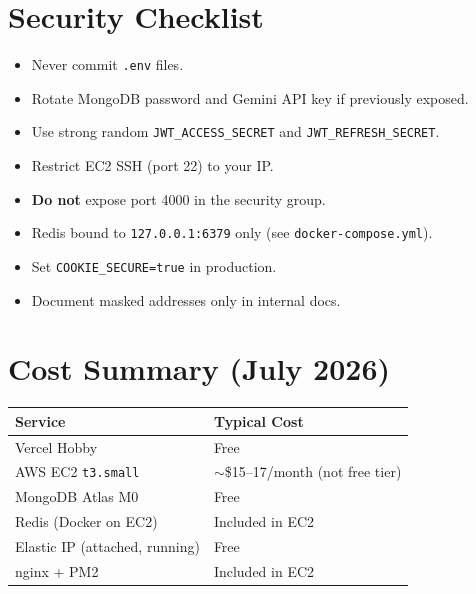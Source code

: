 \documentclass[11pt,a4paper]{article}
\begin{document}
\section{Security Checklist}
\begin{itemize}[noitemsep]
  \item Never commit \texttt{.env} files.
  \item Rotate MongoDB password and Gemini API key if previously exposed.
  \item Use strong random \texttt{JWT\_ACCESS\_SECRET} and \texttt{JWT\_REFRESH\_SECRET}.
  \item Restrict EC2 SSH (port 22) to your IP.
  \item \textbf{Do not} expose port 4000 in the security group.
  \item Redis bound to \texttt{127.0.0.1:6379} only (see \texttt{docker-compose.yml}).
  \item Set \texttt{COOKIE\_SECURE=true} in production.
  \item Document masked addresses only in internal docs.
\end{itemize}

\section{Cost Summary (July 2026)}
\begin{table}[h]
\centering
\begin{tabular}{@{}ll@{}}
\toprule
\textbf{Service} & \textbf{Typical Cost} \\
\midrule
Vercel Hobby           & Free \\
AWS EC2 \texttt{t3.small} & $\sim$\$15--17/month (not free tier) \\
MongoDB Atlas M0       & Free \\
Redis (Docker on EC2)  & Included in EC2 \\
Elastic IP (attached, running) & Free \\
nginx + PM2            & Included in EC2 \\
\bottomrule
\end{tabular}
\end{table}
\end{document}

